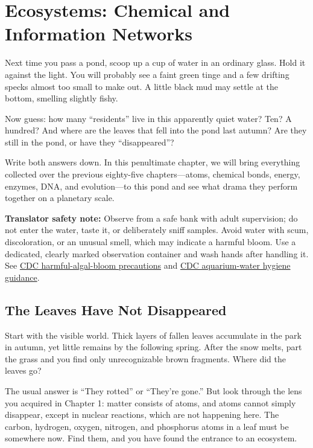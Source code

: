 \chapter{Ecosystems: Chemical and Information Networks}

\begin{kaichang}
Next time you pass a pond, scoop up a cup of water in an ordinary glass. Hold it against the light. You will probably see a faint green tinge and a few drifting specks almost too small to make out. A little black mud may settle at the bottom, smelling slightly fishy.

Now guess: how many ``residents'' live in this apparently quiet water? Ten? A hundred? And where are the leaves that fell into the pond last autumn? Are they still in the pond, or have they ``disappeared''?

Write both answers down. In this penultimate chapter, we will bring everything collected over the previous eighty-five chapters---atoms, chemical bonds, energy, enzymes, DNA, and evolution---to this pond and see what drama they perform together on a planetary scale.
\end{kaichang}

\textbf{Translator safety note:} Observe from a safe bank with adult supervision; do not enter the water, taste it, or deliberately sniff samples. Avoid water with scum, discoloration, or an unusual smell, which may indicate a harmful bloom. Use a dedicated, clearly marked observation container and wash hands after handling it. See \href{https://cdc.gov/harmful-algal-blooms/prevention/index.html}{CDC harmful-algal-bloom precautions} and \href{https://www.cdc.gov/healthy-pets/about/fish.html}{CDC aquarium-water hygiene guidance}.

\section{The Leaves Have Not Disappeared}

Start with the visible world. Thick layers of fallen leaves accumulate in the park in autumn, yet little remains by the following spring. After the snow melts, part the grass and you find only unrecognizable brown fragments. Where did the leaves go?

The usual answer is ``They rotted'' or ``They're gone.'' But look through the lens you acquired in Chapter 1: matter consists of atoms, and atoms cannot simply disappear, except in nuclear reactions, which are not happening here. The carbon, hydrogen, oxygen, nitrogen, and phosphorus atoms in a leaf must be somewhere now. Find them, and you have found the entrance to an ecosystem.

